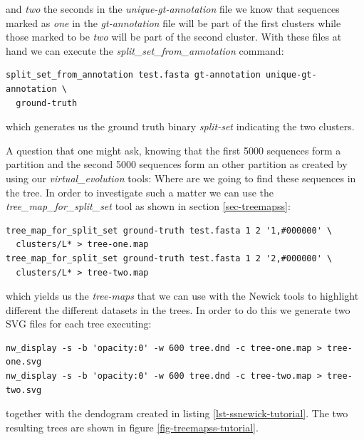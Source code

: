 and \emph{two} the seconds in the \emph{unique-gt-annotation} file we
know that sequences marked as \emph{one} in the \emph{gt-annotation}
file will be part of the first clusters while those marked to be
\emph{two} will be part of the second cluster. With these files at
hand we can execute the \emph{split\_set\_from\_annotation} command:
\begin{lstlisting}
split_set_from_annotation test.fasta gt-annotation unique-gt-annotation \
  ground-truth
\end{lstlisting}
which generates us the ground truth binary \emph{split-set} indicating
the two clusters.

A question that one might ask, knowing that the first 5000 sequences
form a partition and the second 5000 sequences form an other partition
as created by using our \emph{virtual\_evolution} tools: Where are we
going to find these sequences in the tree. In order to investigate
such a matter we can use the \emph{tree\_map\_for\_split\_set} tool
as shown in section \ref{sec-treemapss}:
\begin{lstlisting}
tree_map_for_split_set ground-truth test.fasta 1 2 '1,#000000' \
  clusters/L* > tree-one.map
tree_map_for_split_set ground-truth test.fasta 1 2 '2,#000000' \
  clusters/L* > tree-two.map
\end{lstlisting}
which yields us the \emph{tree-maps} that we can use with the Newick
tools \cite{newick_tools} to highlight different the different
datasets in the trees. In order to do this we generate two SVG files
for each tree executing:
\begin{lstlisting}
nw_display -s -b 'opacity:0' -w 600 tree.dnd -c tree-one.map > tree-one.svg
nw_display -s -b 'opacity:0' -w 600 tree.dnd -c tree-two.map > tree-two.svg
\end{lstlisting}
together with the dendogram created in listing \ref{lst-ssnewick-tutorial}.
The two resulting trees are shown in figure \ref{fig-treemapss-tutorial}.
